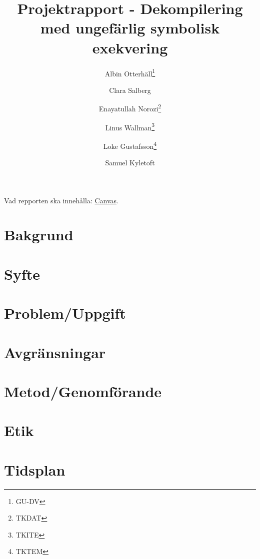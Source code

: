 \documentclass[12pt, a4paper]{article}
\title{Projektrapport - Dekompilering med ungefärlig symbolisk exekvering}
\author{
    Albin Otterhäll\thanks{GU-DV} \and
    Clara Salberg\footnotemark[1] \and
    Enayatullah Norozi\thanks{TKDAT} \and
    Linus Wallman\thanks{TKITE} \and
    Loke Gustafsson\thanks{TKTEM} \and
    Samuel Kyletoft\footnotemark[2]
}
\begin{document}
\maketitle

\newpage

\listoftodos
\newpage

\tableofcontents
\newpage

Vad repporten ska innehålla:
\href{https://chalmers.instructure.com/courses/22323/assignments/66457?module_item_id=337856}{Canvas}.


\section{Bakgrund}


\section{Syfte}


\section{Problem/Uppgift}


\section{Avgränsningar}


\section{Metod/Genomförande}


\section{Etik}


\section{Tidsplan}


\end{document}
